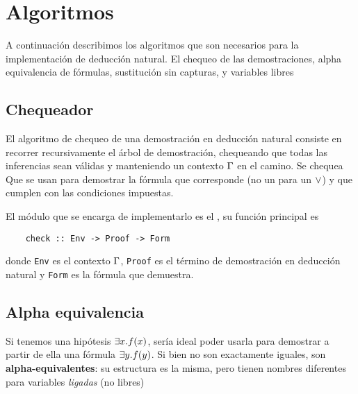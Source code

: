 
\section{Algoritmos}

A continuación describimos los algoritmos que son necesarios para la implementación de deducción natural. El chequeo de las demostraciones, alpha equivalencia de fórmulas, sustitución sin capturas, y variables libres

\subsection{Chequeador}
\label{nd:sec:checker}

El algoritmo de chequeo de una demostración en deducción natural consiste en recorrer recursivamente el árbol de demostración, chequeando que todas las inferencias sean válidas y manteniendo un contexto $\Gamma$ en el camino.
Se chequea Que se usan para demostrar la fórmula que corresponde (no un  para un $\vee$) y que cumplen con las condiciones impuestas.

El módulo que se encarga de implementarlo es el \modChecker, su función principal es

\begin{verbatim}
    check :: Env -> Proof -> Form
\end{verbatim}


donde \texttt{Env} es el contexto $\Gamma$, \texttt{Proof} es el término de demostración en deducción natural y \texttt{Form} es la fórmula que demuestra.

\subsection{Alpha equivalencia}

Si tenemos una hipótesis $\exists x . f(x)$, sería ideal poder usarla para demostrar a partir de ella una fórmula $\exists y . f(y)$. Si bien no son exactamente iguales, son \textbf{alpha-equivalentes}: su estructura es la misma, pero tienen nombres diferentes para variables \textit{ligadas} (no libres)

